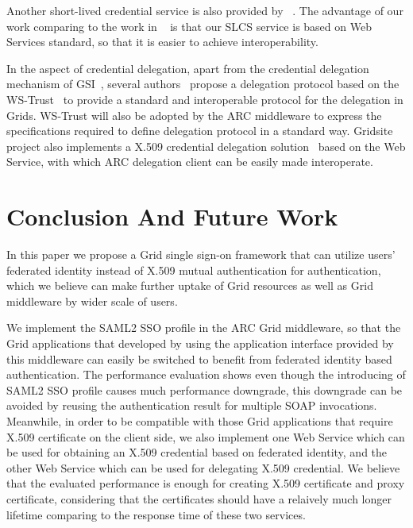 \documentclass[conference]{IEEEtran}
\begin{document}
Another short-lived credential service is also provided by ~\cite{switchslcslink}. 
The advantage of our work comparing to the work in ~\cite{switchslcslink} is that 
our SLCS service is based on Web Services standard, so that it is easier to achieve 
interoperability.

In the aspect of credential delegation, apart from the credential delegation mechanism of 
GSI~\cite{IFoster98,VWelch04}, several authors~\cite{MAhsant04} propose a delegation protocol 
based on the WS-Trust~\cite{WSTrustlink} to provide a standard and interoperable protocol 
for the delegation in Grids. WS-Trust will also be adopted by the ARC middleware to express the 
specifications required to define delegation protocol in a standard way. Gridsite project also
implements a X.509 credential delegation solution~\cite{GridSitelink} based on the Web 
Service, with which ARC delegation client can be easily made interoperate.

\section{Conclusion And Future Work}
\label{sec:conclusion}
In this paper we propose a Grid single sign-on framework that can utilize users' 
federated identity instead of X.509 mutual authentication for authentication, which
we believe can make further uptake of Grid resources as well as Grid middleware by 
wider scale of users.

We implement the SAML2 SSO profile in the ARC Grid middleware, so that the Grid applications
that developed by using the application interface provided by this middleware can easily 
be switched to benefit from federated identity based authentication. 
The performance evaluation shows even though the introducing of SAML2 SSO profile causes 
much performance downgrade, this downgrade can be avoided by reusing the authentication 
result for multiple SOAP invocations.
Meanwhile, in order to be compatible with those Grid applications that require X.509 
certificate on the client side, we also implement one Web Service which can be used for 
obtaining an X.509 credential based on federated identity, and the other Web Service 
which can be used for delegating X.509 credential. We believe that the evaluated 
performance is enough for creating X.509 certificate and proxy certificate, considering that 
the certificates should have a relaively much longer lifetime comparing to the response time of 
these two services.
 
\end{document}
